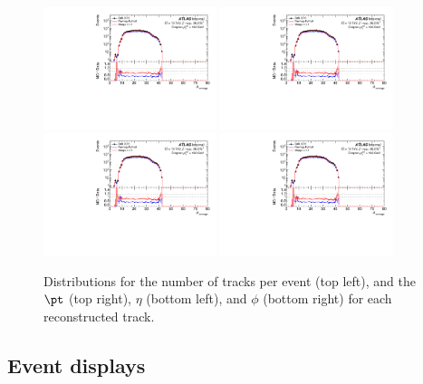 \begin{figure}[h!]
  \centering
  \includegraphics[page=128,width=0.45\textwidth]{figures/ZjetOmnifoldMCDataComp.pdf}
  \includegraphics[page=144,width=0.45\textwidth]{figures/ZjetOmnifoldMCDataComp.pdf} \\
  \includegraphics[page=148,width=0.45\textwidth]{figures/ZjetOmnifoldMCDataComp.pdf}
  \includegraphics[page=152,width=0.45\textwidth]{figures/ZjetOmnifoldMCDataComp.pdf}
  \caption{Distributions for the number of tracks per event (top left), and the $\pt$ (top right), $\eta$ (bottom left), and $\phi$ (bottom right) for each reconstructed track.}
  \label{fig:trackInfo}
\end{figure}

\clearpage
\subsection{Event displays}
\label{sec:event-displays}

